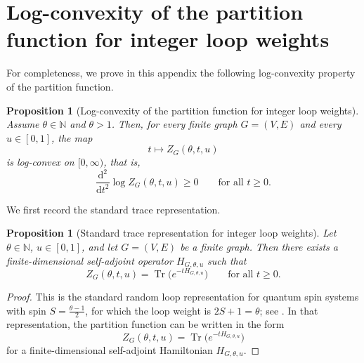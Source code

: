 \documentclass[11pt]{article}
\newtheorem{proposition}[theorem]{Proposition}
\theoremstyle{remark}
\theoremstyle{plain}
\newcommand{\1}{\mathbbm{1}}
\newcommand{\dd}{\mathrm{d}}
\begin{document}
\appendix









\section{Log-convexity of the partition function for integer loop weights}
\label{app:log-convexity}
For completeness, we prove in this appendix the following log-convexity property of the partition function.

\begin{proposition}[Log-convexity of the partition function for integer loop weights]
\label{prop:logconvex}
Assume \(\theta\in\mathbb N\) and \(\theta>1\). Then, for every finite graph
\(G=(V,E)\) and every \(u\in[0,1]\), the map
\[
t\longmapsto Z_G(\theta,t,u)
\]
is log-convex on \([0,\infty)\), that is,
\[
\frac{\dd^2}{\dd t^2}\log Z_G(\theta,t,u)\ge 0
\qquad\text{for all } t\ge 0.
\]
\end{proposition}

We first record the standard trace representation.

\begin{proposition}[Standard trace representation for integer loop weights]
\label{prop:trace-representation}
Let \(\theta\in\mathbb N\), \(u\in[0,1]\), and let \(G=(V,E)\) be a finite graph. Then there exists a finite-dimensional self-adjoint operator \(H_{G,\theta,u}\) such that
\[
Z_G(\theta,t,u)=\operatorname{Tr}\bigl(e^{-tH_{G,\theta,u}}\bigr)
\qquad\text{for all }t\ge 0.
\]
\end{proposition}

\begin{proof}
This is the standard random loop representation for quantum spin systems with spin $S=\frac{\theta-1}{2}$,
for which the loop weight is \(2S+1=\theta\); see \cite[Section~3]{Ueltschi2013}. In that representation, the partition function can be written in the form
\[
Z_G(\theta,t,u)=\operatorname{Tr}\bigl(e^{-tH_{G,\theta,u}}\bigr)
\]
for a finite-dimensional self-adjoint Hamiltonian \(H_{G,\theta,u}\).
\end{proof}
\end{document}
